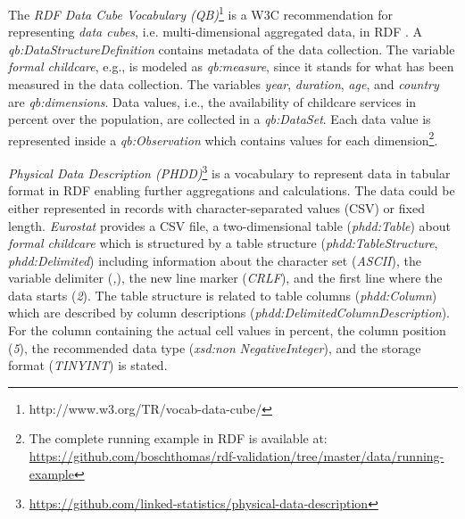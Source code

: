 \documentclass[conference]{IEEEtran}
\newcommand{\ke}[1]{\todo[size=\small, color=red!40]{\textbf{Kai:} #1}}
\newcommand{\tb}[1]{\todo[size=\small, color=green!40]{\textbf{Thomas:} #1}}
\begin{document}
The \emph{RDF Data Cube Vocabulary (QB)}\footnote{http://www.w3.org/TR/vocab-data-cube/} is a W3C recommendation for representing \emph{data cubes}, i.e. multi-dimensional aggregated data, in RDF \cite{Cyganiak2010}. 
A \emph{qb:DataStructureDefinition} contains metadata of the data collection.
The variable \emph{formal childcare}, e.g., is modeled as \emph{qb:measure}, since it stands for what has been measured in the data collection.
The variables \emph{year}, \emph{duration}, \emph{age}, and \emph{country} are \emph{qb:dimensions}.
Data values, i.e., the availability of childcare services in percent over the population, are collected in a \emph{qb:DataSet}. 
Each data value is represented inside a \emph{qb:Observation} which contains values for each dimension\footnote{The complete running example in RDF is available at: \url{https://github.com/boschthomas/rdf-validation/tree/master/data/running-example}}. 

\emph{Physical Data Description (PHDD)}\footnote{\url{https://github.com/linked-statistics/physical-data-description}} is a vocabulary to represent data in tabular format in RDF enabling further aggregations and calculations. 
The data could be either represented in records with character-separated values (CSV) or fixed length. 
\emph{Eurostat} provides a CSV file, a two-dimensional table (\emph{phdd:Table}) about \emph{formal childcare} 
which is structured by a table structure (\emph{phdd:TableStructure}, \emph{phdd:Delimited})
including information about the character set (\emph{ASCII}), the variable delimiter (\emph{,}), the new line marker (\emph{CRLF}), and the first line where the data starts (\emph{2}).
The table structure is related to table columns (\emph{phdd:Column}) which are described by column descriptions (\emph{phdd:DelimitedColumnDescription}).
For the column containing the actual cell values in percent, the column position (\emph{5}), the recommended data type (\emph{xsd:non} \emph{NegativeInteger}), and the storage format (\emph{TINYINT}) is stated. 
\end{document}
